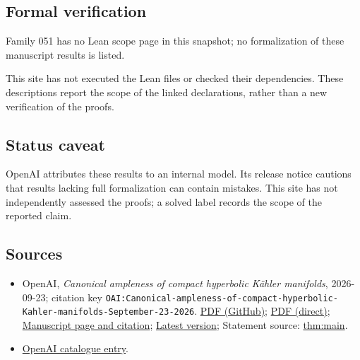 \documentclass[11pt]{article}
\begin{document}
\subsection{Formal verification}
Family 051 has no Lean scope page in this snapshot; no formalization of these manuscript results is listed.

This site has not executed the Lean files or checked their dependencies. These descriptions report the scope of the linked declarations, rather than a new verification of the proofs.

\subsection{Status caveat}
OpenAI attributes these results to an internal model. Its release notice cautions that results lacking full formalization can contain mistakes. This site has not independently assessed the proofs; a solved label records the scope of the reported claim.

\subsection{Sources}
\begin{itemize}
\item OpenAI, \emph{Canonical ampleness of compact hyperbolic Kähler manifolds}, 2026-09-23; citation key \texttt{OAI:Canonical-ampleness-of-compact-hyperbolic-Kahler-manifolds-September-23-2026}. \href{https://github.com/openai/math/blob/adc7f1241b42e322a6451854ab7e4b4c146bf78a/preprints/Canonical-ampleness-of-compact-hyperbolic-Kahler-manifolds-September-23-2026/canonical-ampleness.pdf}{PDF (GitHub)}; \href{https://github.com/openai/math/raw/adc7f1241b42e322a6451854ab7e4b4c146bf78a/preprints/Canonical-ampleness-of-compact-hyperbolic-Kahler-manifolds-September-23-2026/canonical-ampleness.pdf}{PDF (direct)}; \href{https://github.com/openai/math/blob/adc7f1241b42e322a6451854ab7e4b4c146bf78a/preprints/Canonical-ampleness-of-compact-hyperbolic-Kahler-manifolds-September-23-2026/README.md}{Manuscript page and citation}; \href{https://github.com/openai/math/blob/main/preprints/Canonical-ampleness-of-compact-hyperbolic-Kahler-manifolds-September-23-2026/canonical-ampleness.pdf}{Latest version}; Statement source: \href{https://github.com/openai/math/blob/adc7f1241b42e322a6451854ab7e4b4c146bf78a/preprints/Canonical-ampleness-of-compact-hyperbolic-Kahler-manifolds-September-23-2026/build/sections/introduction.tex\#L21}{thm:main}.
\item \href{https://github.com/openai/math/blob/adc7f1241b42e322a6451854ab7e4b4c146bf78a/CONTENTS.md}{OpenAI catalogue entry}.
\end{itemize}
\end{document}
